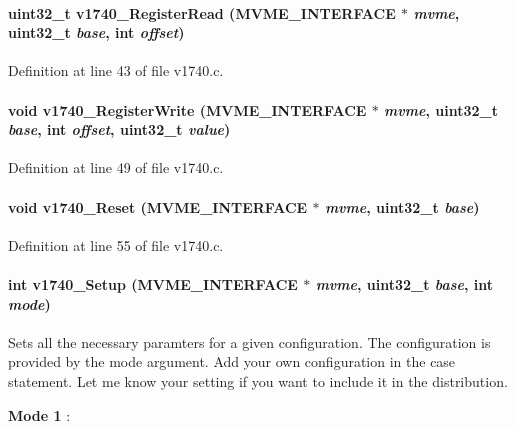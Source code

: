 \paragraph[{v1740\_\-RegisterRead}]{\setlength{\rightskip}{0pt plus 5cm}uint32\_\-t v1740\_\-RegisterRead ({\bf MVME\_\-INTERFACE} $\ast$ {\em mvme}, \/  uint32\_\-t {\em base}, \/  int {\em offset})}\hfill\label{v1740_8c_a61bf6dbf7007cd3aef362ee7690786d2}


Definition at line 43 of file v1740.c.
\paragraph[{v1740\_\-RegisterWrite}]{\setlength{\rightskip}{0pt plus 5cm}void v1740\_\-RegisterWrite ({\bf MVME\_\-INTERFACE} $\ast$ {\em mvme}, \/  uint32\_\-t {\em base}, \/  int {\em offset}, \/  uint32\_\-t {\em value})}\hfill\label{v1740_8c_ad8e262d9f291dc5a7ef6239617dec840}


Definition at line 49 of file v1740.c.
\paragraph[{v1740\_\-Reset}]{\setlength{\rightskip}{0pt plus 5cm}void v1740\_\-Reset ({\bf MVME\_\-INTERFACE} $\ast$ {\em mvme}, \/  uint32\_\-t {\em base})}\hfill\label{v1740_8c_a49b1258739e06b27bfaf8b96ebe7d899}


Definition at line 55 of file v1740.c.
\paragraph[{v1740\_\-Setup}]{\setlength{\rightskip}{0pt plus 5cm}int v1740\_\-Setup ({\bf MVME\_\-INTERFACE} $\ast$ {\em mvme}, \/  uint32\_\-t {\em base}, \/  int {\em mode})}\hfill\label{v1740_8c_a3dac1849caf521655aa250acea6786ac}
Sets all the necessary paramters for a given configuration. The configuration is provided by the mode argument. Add your own configuration in the case statement. Let me know your setting if you want to include it in the distribution.
\begin{DoxyItemize}
\item {\bfseries Mode 1} :
\end{DoxyItemize}


